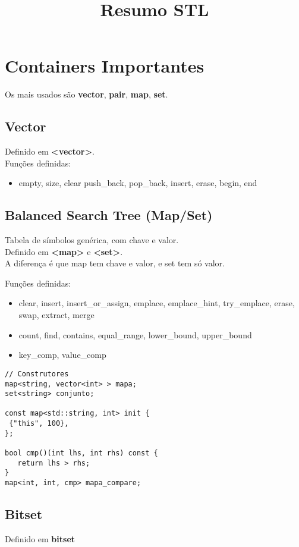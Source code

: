 \documentclass{article}
\title{Resumo STL}
\begin{document}
\maketitle

\section{Containers Importantes}
Os mais usados são \textbf{vector}, \textbf{pair}, \textbf{map}, \textbf{set}.

\subsection{Vector}
Definido em \textbf{<vector>}.\\

Funções definidas:
\begin{itemize}
   \item empty, size, clear push\_back, pop\_back, insert, erase, begin, end
\end{itemize}

\subsection{Balanced Search Tree (Map/Set)}
Tabela de símbolos genérica, com chave e valor.\\
Definido em \textbf{<map>} e \textbf{<set>}. \\
A diferença é que map tem chave e valor, e set tem só valor.

Funções definidas:

\begin{itemize}
   \item clear, insert, insert\_or\_assign, emplace, emplace\_hint, try\_emplace, erase, swap, extract, merge
   \item count, find, contains, equal\_range, lower\_bound, upper\_bound
   \item key\_comp, value\_comp
\end{itemize}

\begin{lstlisting}
// Construtores
map<string, vector<int> > mapa;
set<string> conjunto;

const map<std::string, int> init {
 {"this", 100},
};

bool cmp()(int lhs, int rhs) const {
   return lhs > rhs;
}
map<int, int, cmp> mapa_compare;
\end{lstlisting}

\subsection{Bitset}
Definido em \textbf{bitset}
\end{document}
